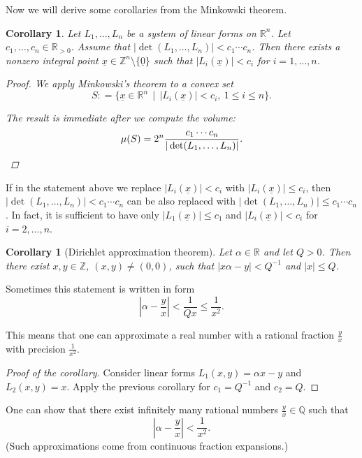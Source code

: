 \documentclass{article}
\newcommand{\dfn}{\mathrel{\mathop:}=}
\newcommand{\ZZ}{\mathbb{Z}}
\newcommand{\QQ}{\mathbb{Q}}
\theoremstyle{myplain}
\newtheorem{corollary}[proposition]{Corollary}
\theoremstyle{mydefinition}
\begin{document}
\vspace{1em}

Now we will derive some corollaries from the Minkowski theorem.

\begin{corollary}\label{corollary:linear-congruences}
  Let $L_1,\ldots,L_n$ be a system of linear forms on $\mathbb{R}^n$. Let
  $c_1,\ldots,c_n \in \mathbb{R}_{> 0}$. Assume that
  $|\det (L_1,\ldots,L_n)| < c_1 \cdots c_n$. Then there exists a nonzero
  integral point $\underline{x} \in \ZZ^n \setminus \{ \underline{0} \}$ such
  that $|L_i (\underline{x})| < c_i$ for $i = 1,\ldots,n$.

  \begin{proof}
    We apply Minkowski's theorem to a convex set
    \[ S \dfn \{ \underline{x} \in \mathbb{R}^n \,\mid\, |L_i (\underline{x})| < c_i, ~ 1 \le i \le n \}. \]

    The result is immediate after we compute the volume:
    \[ \mu (S) = 2^n \frac{c_1\cdots c_n}{|\det (L_1,\ldots,L_n)|}. \qedhere \]
  \end{proof}
\end{corollary}

If in the statement above we replace $|L_i (\underline{x})| < c_i$ with
$|L_i (\underline{x})| \le c_i$, then $|\det (L_1,\ldots,L_n)| < c_1 \cdots c_n$
can be also replaced with $|\det (L_1,\ldots,L_n)| \le c_1 \cdots c_n$. In fact,
it is sufficient to have only $|L_1 (\underline{x})| \le c_1$ and
$|L_i (\underline{x})| < c_i$ for $i = 2, \ldots, n$.

\begin{corollary}[Dirichlet approximation theorem]
  Let $\alpha\in\mathbb{R}$ and let $Q > 0$. Then there exist $x,y \in \ZZ$,
  $(x,y) \ne (0,0)$, such that $|x \alpha - y| < Q^{-1}$ and $|x| \le Q$.
\end{corollary}

Sometimes this statement is written in form
\[ \left| \alpha - \frac{y}{x} \right| < \frac{1}{Qx} \le \frac{1}{x^2}. \]

This means that one can approximate a real number with a rational fraction
$\frac{y}{x}$ with precision $\frac{1}{x^2}$.

\begin{proof}[Proof of the corollary]
  Consider linear forms $L_1 (x,y) = \alpha x - y$ and $L_2 (x,y) = x$. Apply
  the previous corollary for $c_1 = Q^{-1}$ and $c_2 = Q$.
\end{proof}

One can show that there exist infinitely many rational numbers
$\frac{y}{x} \in \QQ$ such that
$$\left| \alpha - \frac{y}{x} \right| < \frac{1}{x^2}.$$
(Such approximations come from continuous fraction expansions.)
\end{document}
